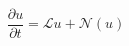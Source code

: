 \documentclass{amsart}
\begin{document}
\begin{large}
$$\frac{\partial u}{\partial t}
= \mathcal{L} u+ \mathcal{N}(u)$$
\end{large}
\end{document}
